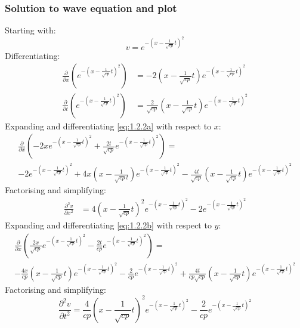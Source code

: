 \documentclass[11pt]{article}
\numberwithin{equation}{section}
\begin{document}
\subsubsection{Solution to wave equation and plot}
Starting with:
\begin{equation}
    v=e^{-\left(x- \frac{1}{\sqrt{cp}}t\right)^2} \label{eq:1.2.2d}
\end{equation}
Differentiating:
\begin{align}
    \frac{\partial}{\partial x} \left(e^{-\left(x- \frac{1}{\sqrt{cp}}t\right)^2}\right) &= -2 \left(x - \frac{1}{\sqrt{cp}}t\right)e^{-\left(x- \frac{1}{\sqrt{cp}}t\right)^2} \label{eq:1.2.2a}\\
    \frac{\partial}{\partial t} \left(e^{-\left(x- \frac{1}{\sqrt{cp}}t\right)^2}\right) &= \frac{2}{\sqrt{cp}}\left(x - \frac{1}{\sqrt{cp}}t\right)e^{-\left(x- \frac{1}{\sqrt{cp}}t\right)^2}\label{eq:1.2.2b}
\end{align}
Expanding and differentiating \ref{eq:1.2.2a} with respect to $x$:
\begin{multline}
    \frac{\partial}{\partial x} \left(-2xe^{-\left(x- \frac{1}{\sqrt{cp}}t\right)^2} + \frac{2t}{\sqrt{cp}}e^{-\left(x- \frac{1}{\sqrt{cp}}t\right)^2}\right) = \\
    -2e^{-\left(x- \frac{1}{\sqrt{cp}}t\right)^2} + 4x\left(x- \frac{1}{\sqrt{cp}t}\right)e^{-\left(x- \frac{1}{\sqrt{cp}}t\right)^2} - \frac{4t}{\sqrt{cp}}\left(x - \frac{1}{\sqrt{cp}}t\right)e^{-\left(x- \frac{1}{\sqrt{cp}}t\right)^2}
\end{multline}
Factorising and simplifying:
\begin{align}
    \frac{\partial^2 v}{\partial x^2} &= 4\left(x - \frac{1}{\sqrt{cp}}t\right)^2 e^{-\left(x- \frac{1}{\sqrt{cp}}t\right)^2} -2e^{-\left(x- \frac{1}{\sqrt{cp}}t\right)^2}
\end{align}
Expanding and differentiating \ref{eq:1.2.2b} with respect to $y$:
\begin{multline}
    \frac{\partial}{\partial x} \left(\frac{2x}{\sqrt{cp}}e^{-\left(x- \frac{1}{\sqrt{cp}}t\right)^2} - \frac{2t}{cp}e^{-\left(x- \frac{1}{\sqrt{cp}}t\right)^2}\right) = \\
    - \frac{4x}{cp}\left(x - \frac{1}{\sqrt{cp}}t\right)e^{-\left(x- \frac{1}{\sqrt{cp}}t\right)^2} - \frac{2}{cp}e^{-\left(x- \frac{1}{\sqrt{cp}}t\right)^2} + \frac{4t}{cp\sqrt{cp}}\left(x - \frac{1}{\sqrt{cp}}t\right)e^{-\left(x- \frac{1}{\sqrt{cp}}t\right)^2}
\end{multline}
Factorising and simplifying:
\begin{equation}
    \frac{\partial^2v}{\partial t^2} = \frac{4}{cp}\left(x - \frac{1}{\sqrt{cp}}t\right)^2 e^{-\left(x- \frac{1}{\sqrt{cp}}t\right)^2} -\frac{2}{cp}e^{-\left(x- \frac{1}{\sqrt{cp}}t\right)^2}
\end{equation}
\end{document}
